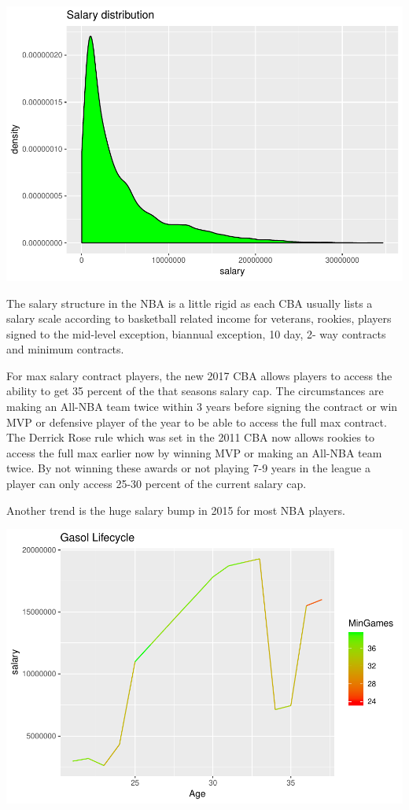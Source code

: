 \documentclass[]{article}
\begin{document}
\includegraphics{nba_salary_final_report_files/figure-latex/unnamed-chunk-3-1.pdf}

The salary structure in the NBA is a little rigid as each CBA usually
lists a salary scale according to basketball related income for
veterans, rookies, players signed to the mid-level exception, biannual
exception, 10 day, 2- way contracts and minimum contracts.

For max salary contract players, the new 2017 CBA allows players to
access the ability to get 35 percent of the that seasons salary cap. The
circumstances are making an All-NBA team twice within 3 years before
signing the contract or win MVP or defensive player of the year to be
able to access the full max contract. The Derrick Rose rule which was
set in the 2011 CBA now allows rookies to access the full max earlier
now by winning MVP or making an All-NBA team twice. By not winning these
awards or not playing 7-9 years in the league a player can only access
25-30 percent of the current salary cap.

Another trend is the huge salary bump in 2015 for most NBA players.

\includegraphics{nba_salary_final_report_files/figure-latex/unnamed-chunk-4-1.pdf}
\end{document}

